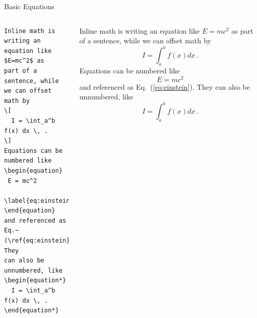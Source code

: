 \documentclass[aspectratio=1610]{beamer}
\begin{document}
\begin{frame}[fragile]{Basic Equations}
  \begin{columns}[T]
      \begin{lstlisting}
Inline math is writing an 
equation like $E=mc^2$ as 
part of a sentence, while 
we can offset math by
\[
  I = \int_a^b f(x) dx \, .
\]
Equations can be numbered like
\begin{equation}
 E = mc^2  
 \label{eq:einstein}
\end{equation}
and referenced as 
Eq.~(\ref{eq:einstein}). They
can also be unnumbered, like
\begin{equation*}
  I = \int_a^b f(x) dx \, .
\end{equation*}
      \end{lstlisting}
Inline math is writing an 
equation like $E=mc^2$ as 
part of a sentence, while 
we can offset math by
\[
  I = \int_a^b f(x) dx \, .
\]
Equations can be numbered like
\begin{equation}
 E = mc^2  
 \label{eq:einstein}
\end{equation}
and referenced as 
Eq.~(\ref{eq:einstein}). They
can also be unnumbered, like
\begin{equation*}
  I = \int_a^b f(x) dx \, .
\end{equation*}
  \end{columns}
\end{frame}
\end{document}
